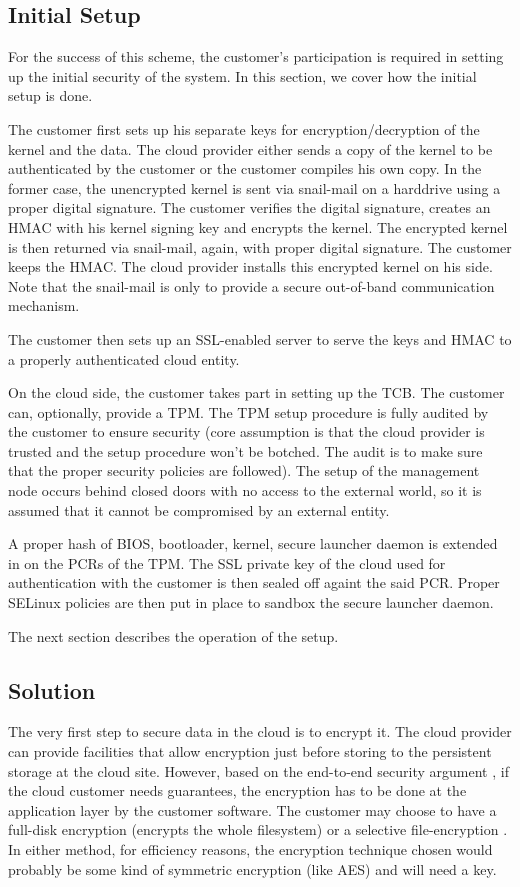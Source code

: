 \documentclass[10pt,twocolumn,pdftex]{article}
\begin{document}
\subsection{Initial Setup}
For the success of this scheme, the customer's participation is required in setting up the initial security of the system. In this section, we cover how the initial setup is done.

The customer first sets up his separate keys for encryption/decryption of the kernel and the data. The cloud provider either sends a copy of the kernel to be authenticated by the customer or the customer compiles his own copy. In the former case, the unencrypted kernel is sent via snail-mail on a harddrive using a proper digital signature. The customer verifies the digital signature, creates an HMAC with his kernel signing key and encrypts the kernel. The encrypted kernel is then returned via snail-mail, again, with proper digital signature. The customer keeps the HMAC. The cloud provider installs this encrypted kernel on his side. Note that the snail-mail is only to provide a secure out-of-band communication mechanism.

The customer then sets up an SSL-enabled server to serve the keys and  HMAC to a properly authenticated cloud entity. 

On the cloud side, the customer takes part in setting up the TCB. The customer can, optionally, provide a TPM. The TPM setup procedure is fully audited by the customer to ensure security (core assumption is that the cloud provider is trusted and the setup procedure won't be botched. The audit is to make sure that the proper security policies are followed). The setup of the management node occurs behind closed doors with no access to the external world, so it is assumed that it cannot be compromised by an external entity.

A proper hash of {BIOS, bootloader, kernel, secure launcher daemon} is extended in on the PCRs of the TPM. The SSL private key of the cloud used for authentication with the customer is then sealed off againt the said PCR. Proper SELinux policies are then put in place to sandbox the secure launcher daemon.

The next section describes the operation of the setup.

\subsection{Solution}
The very first step to secure data in the cloud is to encrypt it. The cloud provider can provide facilities that allow encryption just before storing to the persistent storage at the cloud site. However, based on the end-to-end security argument \cite{end-to-end}, if the cloud customer needs guarantees, the encryption has to be done at the application layer by the customer software. The customer may choose to have a full-disk encryption (encrypts the whole filesystem) \cite{disk-encryption, truecrypt} or a selective file-encryption \cite{nss}. In either method, for efficiency reasons, the encryption technique chosen would probably be some kind of symmetric encryption (like AES) and will need a key.
\end{document}
